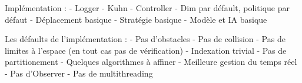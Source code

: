 Implémentation :
- Logger
- Kuhn
- Controller
- Dim par défault, politique par défaut
- Déplacement basique
- Stratégie basique
- Modèle et IA basique

Les défaults de l'implémentation :
- Pas d'obstacles
- Pas de collision
- Pas de limites à l'espace (en tout cas pas de vérification)
- Indexation trivial
- Pas de partitionement
- Quelques algorithmes à affiner
- Meilleure gestion du temps réel
- Pas d'Observer
- Pas de multithreading
